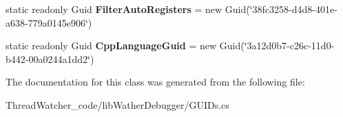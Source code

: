 \begin{DoxyCompactItemize}
\item 
\hypertarget{class_thread_watcher_1_1_g_u_i_ds_a84a41c5185abb23736bd9a8fa638b880}{static readonly Guid {\bfseries Filter\+Auto\+Registers} = new Guid(\char`\"{}38fc3258-\/d4d8-\/401e-\/a638-\/779a0145e906\char`\"{})}\label{class_thread_watcher_1_1_g_u_i_ds_a84a41c5185abb23736bd9a8fa638b880}

\item 
\hypertarget{class_thread_watcher_1_1_g_u_i_ds_a274cf68fa7c9788738b532cbd7774d7d}{static readonly Guid {\bfseries Cpp\+Language\+Guid} = new Guid(\char`\"{}3a12d0b7-\/c26c-\/11d0-\/b442-\/00a0244a1dd2\char`\"{})}\label{class_thread_watcher_1_1_g_u_i_ds_a274cf68fa7c9788738b532cbd7774d7d}

\end{DoxyCompactItemize}


The documentation for this class was generated from the following file\+:\begin{DoxyCompactItemize}
\item 
Thread\+Watcher\+\_\+code/lib\+Wather\+Debugger/G\+U\+I\+Ds.\+cs\end{DoxyCompactItemize}
